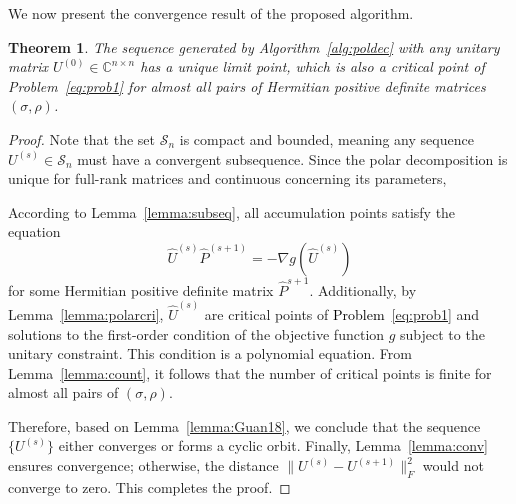 \documentclass[sn-mathphys-num]{sn-jnl}%
\theoremstyle{thmstyleone}%
\newtheorem{theorem}{Theorem}%
\theoremstyle{thmstyletwo}%
\theoremstyle{thmstylethree}%
\begin{document}
We now present the convergence result of the proposed algorithm.
\begin{theorem}
    The sequence generated by Algorithm~\ref{alg:poldec} with any unitary matrix $U^{(0)}\in \mathbb{C}^{n\times n}$ has a unique limit point, which is also a critical point of { \color{black}Problem~\ref{eq:prob1}} for almost all pairs of Hermitian positive definite matrices $(\sigma, \rho)$. 
\end{theorem}
%
%
%
\begin{proof}
Note that the set $\mathcal{S}_n$ is compact and bounded, meaning any sequence $U^{(s)} \in \mathcal{S}_n$ must have a convergent subsequence. Since the polar decomposition is unique for full-rank matrices and continuous concerning its parameters, 

According to Lemma~\ref{lemma:subseq}, all accumulation points satisfy the equation
\[
\hat{U}^{(s)} \hat{P}^{(s+1)} = -\nabla g(\hat{U}^{(s)})
\]
for some Hermitian positive definite matrix $\hat{P}^{s+1}$. Additionally, by Lemma~\ref{lemma:polarcri}, $\hat{U}^{(s)}$ are critical points of \textcolor{black}{Problem~\ref{eq:prob1}} and solutions to the first-order condition of the objective function $g$ subject to the unitary constraint. {\color{black}This condition is a polynomial equation.} From Lemma~\ref{lemma:count}, it follows that the number of critical points is finite for almost all pairs of $(\sigma, \rho)$.

Therefore, based on  Lemma~\ref{lemma:Guan18}, we conclude that the sequence $\{U^{(s)}\}$ either converges or forms a cyclic orbit. Finally, Lemma~\ref{lemma:conv} ensures convergence; otherwise, the distance $\|U^{(s)} - U^{(s+1)}\|_F^2$ would not converge to zero. This completes the proof.
%
%
\end{proof}



\end{document}
